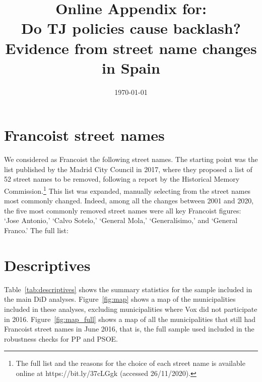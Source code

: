 \documentclass[12pt, titlepage]{article}
\title{\Large Online Appendix for:\\Do TJ policies cause backlash?\\Evidence from street name changes in Spain}
\author{}
\date{\today}
\begin{document}
\maketitle

\tableofcontents

\clearpage
\section{Francoist street names}\label{app:franc_names_list}

We considered as Francoist the following street names. The starting point was the list published by the Madrid City Council in 2017, where they proposed a list of 52 street names to be removed, following a report by the Historical Memory Commission.\footnote{The full list and the reasons for the choice of each street name is available online at https://bit.ly/37cLGgk (accessed 26/11/2020).}
This list was expanded, manually selecting from the street names most commonly changed.
Indeed, among all the changes between 2001 and 2020, the five most commonly removed street names were all key Francoist figures: `Jose Antonio,' `Calvo Sotelo,' `General Mola,' `Generalísimo,' and `General Franco.' The full list:

\begin{quote}
  
\end{quote}

\clearpage
\section{Descriptives}\label{app:descriptives}

Table~\ref{tab:descriptives} shows the summary statistics for the sample included in the main DiD analyses. Figure~\ref{fig:map} shows a map of the municipalities included in these analyses, excluding municipalities where Vox did not participate in 2016.
Figure~\ref{fig:map_full} shows a map of all the municipalities that still had Francoist street names in June 2016, that is, the full sample used included in the robustness checks for PP and PSOE.


\end{document}
